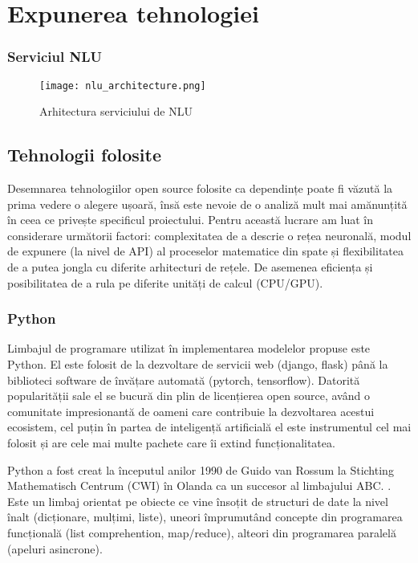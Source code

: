 \chapter{Expunerea tehnologiei}

\subsection{Serviciul NLU}
\begin{figure}[h]
	\texttt{[image: nlu\_architecture.png]}
	\caption{Arhitectura serviciului de NLU}
	\label{fig:nlu_arch}
\end{figure}

\section{Tehnologii folosite}

Desemnarea tehnologiilor open source folosite ca dependințe poate fi văzută la prima vedere o alegere ușoară, însă este nevoie de o analiză mult mai amănunțită în ceea ce privește specificul proiectului.
Pentru această lucrare am luat în considerare următorii factori: complexitatea de a descrie o rețea neuronală, modul de expunere (la nivel de API) al proceselor matematice din spate și flexibilitatea de a putea jongla cu diferite arhitecturi de rețele. De asemenea eficiența și posibilitatea de a rula pe diferite unități de calcul (CPU/GPU).

\subsection{Python}

Limbajul de programare utilizat în implementarea modelelor propuse este Python. El este folosit de la dezvoltare de servicii web (django, flask) până la biblioteci software de învățare automată (pytorch, tensorflow). Datorită popularității sale el se bucură din plin de licențierea open source, având o comunitate impresionantă de oameni care contribuie la dezvoltarea acestui ecosistem, cel puțin în partea de inteligență artificială el este instrumentul cel mai folosit și are cele mai multe pachete care îi extind funcționalitatea. 

Python a fost creat la începutul anilor 1990 de Guido van Rossum la Stichting Mathematisch Centrum (CWI) în Olanda ca un succesor al limbajului ABC. \cite{pythonhistory}. Este un limbaj orientat pe obiecte ce vine însoțit de structuri de date la nivel înalt (dicționare, mulțimi, liste), uneori împrumutând concepte din programarea funcțională (list comprehention, map/reduce), alteori din programarea paralelă (apeluri asincrone).

